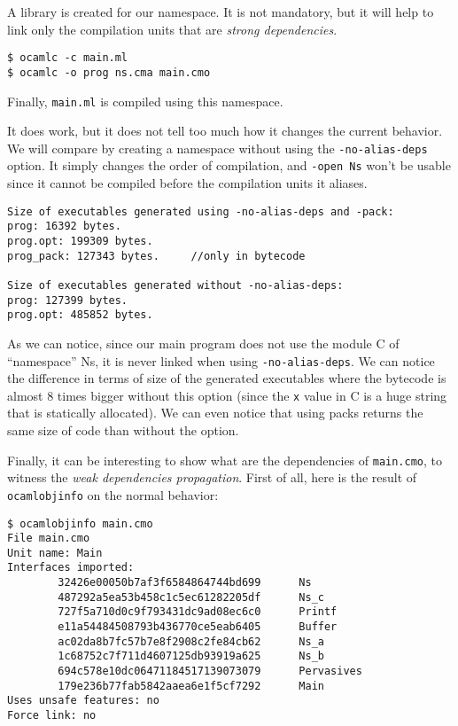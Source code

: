 \documentclass[11pt,a4paper]{article}
\begin{document}
A library is created for our namespace. It is not mandatory, but it will help to
link only the compilation units that are \emph{strong dependencies}.

\begin{verbatim}
$ ocamlc -c main.ml
$ ocamlc -o prog ns.cma main.cmo
\end{verbatim}

Finally, \texttt{main.ml} is compiled using this namespace.

It does work, but it does not tell too much how it changes the current
behavior. We will compare by creating a namespace without using the
\texttt{-no-alias-deps} option. It simply changes the order of compilation, and
\texttt{-open Ns} won't be usable since it cannot be compiled before the
compilation units it aliases.

\begin{verbatim}
Size of executables generated using -no-alias-deps and -pack:
prog: 16392 bytes.
prog.opt: 199309 bytes.
prog_pack: 127343 bytes.     //only in bytecode

Size of executables generated without -no-alias-deps:
prog: 127399 bytes.
prog.opt: 485852 bytes.
\end{verbatim}

As we can notice, since our main program does not use the module C of
``namespace'' Ns, it is never linked when using \texttt{-no-alias-deps}. We can
notice the difference in terms of size of the generated executables where the
bytecode is almost 8 times bigger without this option (since the \texttt{x}
value in C is a huge string that is statically allocated). We can even notice
that using packs returns the same size of code than without the option.

Finally, it can be interesting to show what are the dependencies of
\texttt{main.cmo}, to witness the \emph{weak dependencies propagation}. First of
all, here is the result of \texttt{ocamlobjinfo} on the normal behavior:

\begin{verbatim}
$ ocamlobjinfo main.cmo
File main.cmo
Unit name: Main
Interfaces imported:
        32426e00050b7af3f6584864744bd699      Ns
        487292a5ea53b458c1c5ec61282205df      Ns_c
        727f5a710d0c9f793431dc9ad08ec6c0      Printf
        e11a54484508793b436770ce5eab6405      Buffer
        ac02da8b7fc57b7e8f2908c2fe84cb62      Ns_a
        1c68752c7f711d4607125db93919a625      Ns_b
        694c578e10dc06471184517139073079      Pervasives
        179e236b77fab5842aaea6e1f5cf7292      Main
Uses unsafe features: no
Force link: no
\end{verbatim}
\end{document}
